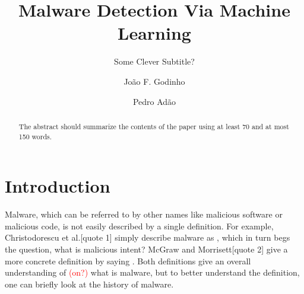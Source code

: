 \documentclass{llncs}
\begin{document}
\frontmatter

\title{Malware Detection Via Machine Learning}
\subtitle{Some Clever Subtitle?}
\author{João F. Godinho \and Pedro Adão}
\maketitle
{}

\begin{abstract}
The abstract should summarize the contents of the paper
using at least 70 and at most 150 words.
\end{abstract}



\clearpage
{}



\mainmatter
\section{Introduction}\label{sec_introduction}
Malware, which can be referred to by other names like malicious software or malicious code, is not easily described by a single definition. For example, Christodorescu et al.[quote 1] simply describe malware as , which in turn begs the question, what is malicious intent? McGraw and Morrisett[quote 2] give a more concrete definition by saying . Both definitions give an overall understanding of \textcolor{red}{(on?)} what is malware, but to better understand the definition, one can briefly look at the history of malware.
\end{document}
